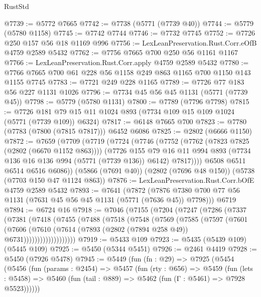 \begin{lexlean}{RustStd}
\begin{coremodule}
@7739 := @5772 @7665
@7742 := @7738 (@5771 (@7739 @40))
@7744 := @5779 (@5780 @1158)
@7745 := @7742 @7744
@7746 := @7732 @7745
@7752 := @7726 @250 @157 @56 @18 @1169 @996
@7756 := LexLeanPreservation.Rust.Corr.eOfB @4759 @2589 @5432
@7762 := @7756 @7665 @700 @250 @56 @1161 @1167
@7766 := LexLeanPreservation.Rust.Corr.apply @4759 @2589 @5432
@7780 := @7766 @7665 @700 @61 @228 @56 @1158 @249 @863 @1165 @700 @1150 @143 @1155 @7745
@7783 := @7721 @249 @228 @1165
@7789 := @7726 @77 @183 @56 @227 @1131 @1026
@7796 := @7734 @45 @56 @45 @1131 (@5771 (@7739 @45))
@7798 := @5779 (@5780 @1131)
@7800 := @7789 (@7796 @7798)
@7815 := @7726 @181 @79 @15 @11 @1024 @893 (@7734 @109 @15 @109 @1024 (@5771 (@7739 @109)) @6324)
@7817 := @6148 @7665 @700
@7823 := @7780 (@7783 (@7800 (@7815 @7817))) @6452 @6086
@7825 := @2802 (@6666 @1150)
@7872 := @7659
    (@7709
      (@7719
        (@7724
          (@7746
            (@7752
              (@7762 (@7823 @7825 (@2802 (@6670 @1152 @863))))
              (@7726
                @155
                @79
                @16
                @11
                @994
                @893
                (@7734 @136 @16 @136 @994 (@5771 (@7739 @136)) @6142)
                @7817))))
        @6508
        @6511
        @6514
        @6516
        @6086))
    (@5866 (@7691 @40))
    (@2802 (@7696 @48 @150))
    (@5738 (@7703 @150 @47 @1124 @863))
@7876 := LexLeanPreservation.Rust.Corr.bOfE @4759 @2589 @5432
@7893 := @7641
    (@7872 (@7876 @7380 @700 @77 @56 @1131 (@7631 @45 @56 @45 @1131 (@5771 (@7636 @45)) @7798)))
    @6719
@7894 := @6724 @16
@7918 := @7046
    (@7155
      (@7204
        (@7247
          (@7286
            (@7337
              (@7381
                (@7418
                  (@7455
                    (@7488
                      (@7518
                        (@7548
                          (@7569
                            (@7585
                              (@7597
                                (@7601
                                  (@7606
                                    (@7610
                                      (@7614
                                        (@7893 (@2802 (@7894 @258 @49)) @6731)))))))))))))))))))
@7919 := @5433 @109
@7923 := @5435 (@5439 @109) (@5445 @109)
@7925 := @5450 (@5344 @5451)
@7926 := @2461 @4419
@7928 := @5450 (@7926 @5478)
@7945 := @5449
    (fun (fn : @29) =>
    @7925
      (@5454
        (@5456
          (fun (params : @2454) =>
          @5457
            (fun (rty : @656) =>
            @5459
              (fun (lets : @5458) =>
              @5460 (fun (tail : @889) => @5462 (fun (Γ : @5461) => @7928 @5523))))))

\end{coremodule}
\end{lexlean}
